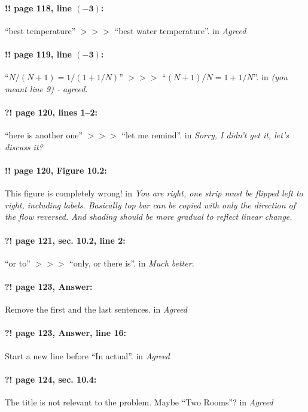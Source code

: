 \documentclass[twoside]{article}
\begin{document}
\paragraph{!! page 118, line $\bm{(-3)}$:} ``best temperature'' $>\!>\!>$ ``best water temperature''.
 in {\it  Agreed} 

\paragraph{!! page 119, line $\bm{(-3)}$:} ``$N/(N+1)=1/(1+1/N)$'' $>\!>\!>$ ``$(N+1)/N = 1 + 1/N$''.
 in {\it    (you meant line 9) - agreed.} 

\paragraph{?! page 120, lines 1--2:} ``here is another one'' $>\!>\!>$ ``let me remind''.
 in {\it  Sorry, I didn't get it, let's discuss it? } 

\paragraph{!! page 120, Figure 10.2:} This figure is completely wrong!
 in {\it  You are right, one strip must be flipped left to right, including labels. Basically top bar can be copied with only the direction of the flow reversed. And shading should be more gradual to reflect linear change.} 


\paragraph{?! page 121, sec. 10.2, line 2:} ``or to'' $>\!>\!>$ ``only, or there is''.
 in {\it  Much better.} 

\paragraph{?! page 123, Answer:} Remove the first and the last sentences.
 in {\it  Agreed} 

\paragraph{?! page 123, Answer, line 16:} Start a new line before ``In actual''.
 in {\it  Agreed} 

\paragraph{?! page 124, sec. 10.4:} The title is not relevant to the problem. Maybe ``Two Rooms''?
 in {\it  Agreed} 
\end{document}
